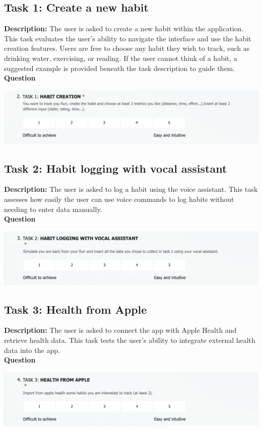 \documentclass{article}
\newcommand{\newpar}[0]{\vspace{2mm}\noindent}
\newcommand{\ititle}[1]{\newpar\hspace{1em}\textbf{#1}}
\begin{document}
\subsection{Task 1: Create a new habit}
\ititle{Description:} The user is asked to create a new habit within the application. This task evaluates the user's ability to navigate the interface and use the habit creation features.
Users are free to choose any habit they wish to track, such as drinking water, exercising, or reading.
If the user cannot think of a habit, a suggested example is provided beneath the task description to guide them.
\\
\ititle{Question}
\begin{center}
  \includegraphics[width=\linewidth]{images/habit_creation.png}
\end{center}

\subsection{Task 2: Habit logging with vocal assistant}
\ititle{Description:} The user is asked to log a habit using the voice assistant. This task assesses how easily the user can use voice commands to log habits without needing to enter data manually.
\\
\ititle{Question}
\begin{center}
	  \includegraphics[width=\linewidth]{images/habit_logging_va.png}
\end{center}

\subsection{Task 3: Health from Apple}
\ititle{Description:} The user is asked to connect the app with Apple Health and retrieve health data. This task tests the user’s ability to integrate external health data into the app.
\\
\ititle{Question}
\begin{center}
	  \includegraphics[width=\linewidth]{images/apple_health.png}
\end{center}
\end{document}
